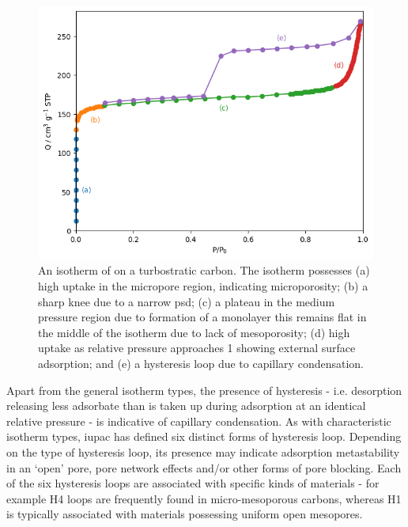 \begin{figure}[t!]
    \centering
    \includegraphics[width=\columnwidth, keepaspectratio]{1-introduction/figs/isotherm_anatomy.png}
    \caption{An isotherm of  on a turbostratic carbon. The isotherm possesses (a) high uptake in the micropore region, indicating microporosity; (b) a sharp knee due to a narrow \acrshort{psd}; (c) a plateau in the medium pressure region due to formation of a monolayer this remains flat in the middle of the isotherm due to lack of mesoporosity; (d) high uptake as relative pressure approaches 1 showing external surface adsorption; and (e) a hysteresis loop due to capillary condensation.}
    \label{fig:isotherm_anatomy}
\end{figure}

Apart from the general isotherm types, the presence of hysteresis - i.e. desorption releasing less \gls{adsorbate} than is taken up during adsorption at an identical relative pressure - is indicative of capillary condensation.\citep{thommes2014physical, monson2012understanding, landers2013density} As with characteristic isotherm types, \acrshort{iupac} has defined six distinct forms of hysteresis loop. Depending on the type of hysteresis loop, its presence may indicate adsorption metastability in an `open' pore, pore network effects and/or other forms of pore blocking.\citep{Thommes2015Physisorption} Each of the six hysteresis loops are associated with specific kinds of materials - for example H4 loops are frequently found in micro-mesoporous carbons, whereas H1 is typically associated with materials possessing uniform open mesopores.\citep{Thommes2015Physisorption, monson2012understanding}  

